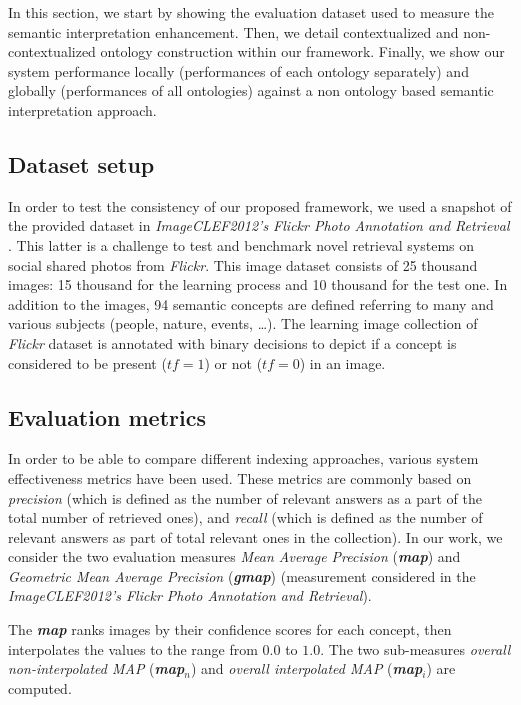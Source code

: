 		In this section, we start by showing the evaluation dataset used to measure the semantic interpretation enhancement. 
		Then, we detail contextualized 
		and non-contextualized ontology construction within our framework. Finally, we show our system performance 
		locally (performances of each ontology separately) and globally (performances of all ontologies) against a non 
		ontology based semantic interpretation approach.

		\subsection{Dataset setup}
			In order to test the consistency of our proposed framework, we used a snapshot of the 
			provided dataset in \emph{ImageCLEF2012's Flickr Photo Annotation and Retrieval} \cite{Thomee2012}. 
			This latter is a challenge to test and benchmark novel
			retrieval systems on social shared photos from \emph{Flickr}.
			This image dataset consists of 25 thousand images: 15 thousand for the learning process 
			and 10 thousand for the test one.		
			In addition to the images, 94 semantic concepts are defined referring to many and various 
			subjects (people, nature, events, \dots). 
			The learning image collection of \emph{Flickr} dataset is annotated with 
			binary decisions to depict if a concept is considered to 
			be present ($tf = 1$) or not ($tf = 0$) in an image. 
			
		\subsection{Evaluation metrics}
			In order to be able to compare different indexing approaches, various system effectiveness 
			metrics have been used. These metrics are commonly based on \emph{precision} (which is defined 
			as the number of relevant answers as a part of the total number of retrieved ones), and \emph{recall} 
			(which is defined as the number of relevant answers as part of total relevant ones in the collection). 
			In our work, we consider the two evaluation measures \emph{Mean Average Precision} (\textit{\textbf{map}}) and  
			\emph{Geometric Mean Average Precision} (\textit{\textbf{gmap}}) \cite{Thomee2012} (measurement considered in the 
			\emph{ImageCLEF2012's Flickr Photo Annotation and Retrieval}).

			The \textit{\textbf{map}} ranks
			images by their confidence scores for each concept,
			then interpolates the values to the range from $0.0$ to $1.0$. The two sub-measures \emph{overall 
			non-interpolated MAP} (\textit{\textbf{map$_{n}$}}) 
			and \emph{overall interpolated MAP} (\textit{\textbf{map$_{i}$}})  are computed.

